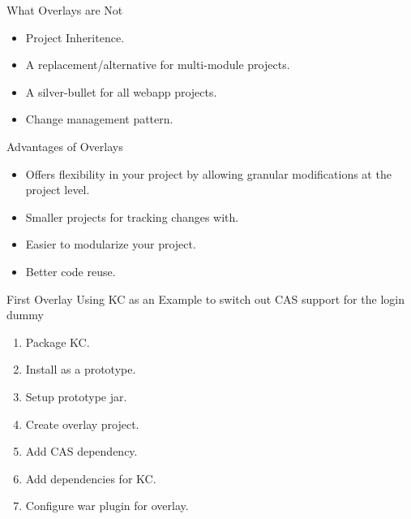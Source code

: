 \documentclass[xcolor=dvipsnames,14pt]{beamer}
\begin{document}
\begin{frame}{What Overlays are Not}
  \begin{itemize}
  \item Project Inheritence.
  \item A replacement/alternative for multi-module projects.
  \item A silver-bullet for all webapp projects.
  \item Change management pattern.
  \end{itemize}
\end{frame}


\begin{frame}{Advantages of Overlays}
  \begin{itemize}
    \item Offers flexibility in your project by allowing granular
      modifications at the project level.
    \item Smaller projects for tracking changes with.
    \item Easier to modularize your project.
    \item Better code reuse.
  \end{itemize}
\end{frame}

\begin{frame}{First Overlay}
  Using KC as an Example to switch out CAS support for the login dummy
  \begin{enumerate}
    \item Package KC.
    \item Install as a prototype.
    \item Setup prototype jar.
    \item Create overlay project.
    \item Add CAS dependency.
    \item Add dependencies for KC.
    \item Configure war plugin for overlay.
  \end{enumerate}
\end{frame}
\end{document}
